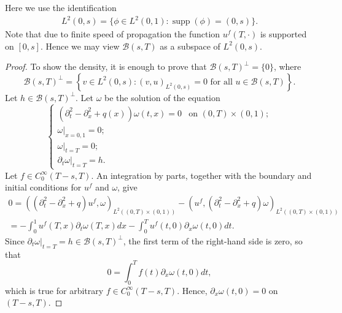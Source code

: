 \documentclass[12pt,oneside,final]{amsart}
\DeclareMathOperator{\supp}{supp}
\begin{document}
Here we use the identification
	\begin{align*}
L^2(0,s) = \{\phi \in L^2(0,1) : \supp(\phi) = (0,s)\}.
	\end{align*}
Note that due to finite speed of propagation the function $u^f(T, \cdot)$ is supported on $[0,s]$. Hence we may view $\mathcal{B}(s,T)$ as a subspace of $L^2(0,s)$.

\begin{proof}
	To show the density, it is enough to prove that $\mathcal{B}(s,T)^{\perp} = \{0\}$, where
	\begin{equation*}
		\mathcal{B}(s,T)^{\perp} = \left\{v\in L^2(0,s): (v,u)_{L^2(0,s)} = 0 \text{ for all } u \in 	\mathcal{B}(s,T)\right\}.
	\end{equation*}
	Let $h\in \mathcal{B}(s,T)^{\perp}$. Let $\omega$ be the solution of the equation
	\begin{equation*}
		\begin{cases}
			\left( \partial_t^2 - \partial_x^2 + q(x)\right)\omega(t,x) = 0 & \text{on } (0,T)\times (0,1);\\
			\left.\omega\right|_{x=0,1} = 0;\\
			\left.\omega\right|_{t=T} = 0;\\
			\left.\partial_t \omega\right|_{t=T} = h.
		\end{cases}
	\end{equation*}
	Let $f\in C_0^\infty(T-s,T)$. An integration by parts, together with the boundary and initial conditions for $u^f$ and $\omega$, give
	\begin{multline*}
		0 = \left(\left( \partial_t^2 - \partial_x^2 + q\right)u^f, \omega\right)_{L^2((0,T)\times(0,1))} - \left(u^f, \left( \partial_t^2 - \partial_x^2 + q\right)\omega\right)_{L^2((0,T)\times(0,1))}\\
		= -\int_0^1u^f(T,x)\partial_t\omega(T,x) dx - \int_0^Tu^f(t,0) \partial_x\omega(t,0) dt.
	\end{multline*}
	Since $\left.\partial_t \omega\right|_{t=T} = h\in \mathcal{B}(s,T)^{\perp}$, the first term of the right-hand side is zero, so that
	\begin{equation*}
	0 = \int_0^T f(t) \partial_x\omega(t,0) dt,
	\end{equation*}
	which is true for arbitrary $f\in C_0^\infty(T-s,T)$. Hence, $\partial_x\omega(t,0) = 0$ on $(T - s, T)$. 
	

\end{proof}
\end{document}
